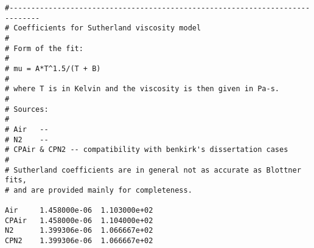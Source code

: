 \linenumbers*
\begin{verbatim}
#-----------------------------------------------------------------------------
# Coefficients for Sutherland viscosity model
# 
# Form of the fit:
# 
# mu = A*T^1.5/(T + B)
# 
# where T is in Kelvin and the viscosity is then given in Pa-s.
# 
# Sources:
# 
# Air   -- 
# N2    -- 
# CPAir & CPN2 -- compatibility with benkirk's dissertation cases
# 
# Sutherland coefficients are in general not as accurate as Blottner fits,
# and are provided mainly for completeness.

Air     1.458000e-06  1.103000e+02
CPAir   1.458000e-06  1.104000e+02
N2      1.399306e-06  1.066667e+02
CPN2    1.399306e-06  1.066667e+02
\end{verbatim}
\nolinenumbers
